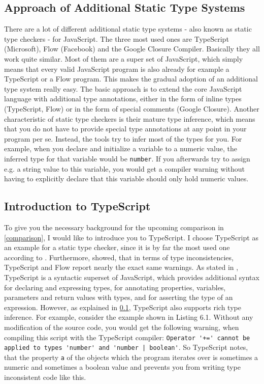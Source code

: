 \documentclass[runningheads,a4paper]{llncs}
\begin{document}
\subsection{Approach of Additional Static Type Systems} \label{staticTypeSystems}
There are a lot of different additional static type systems - also known as static type checkers - for JavaScript.
The three most used ones are TypeScript (Microsoft), Flow (Facebook) and the Google Closure Compiler.
Basically they all work quite similar.
Most of them are a super set of JavaScript, which simply means that every valid JavaScript program is also already for example a TypeScript or a Flow program.
This makes the gradual adoption of an additional type system really easy.
The basic approach is to extend the core JavaScript language with additional type annotations, either in the form of inline types (TypeScript, Flow) or in the form of special comments (Google Closure).
Another characteristic of static type checkers is their mature type inference, which means that you do not have to provide special type annotations at any point in your program per se.
Instead, the tools try to infer most of the types for you. 
For example, when you declare and initialize a variable to a numeric value, the inferred type for that variable would be \lstinline[columns=fixed]{number}.
If you afterwards try to assign e.g. a string value to this variable, you would get a compiler warning without having to explicitly declare that this variable should only hold numeric values.


\subsection{Introduction to TypeScript}
To give you the necessary background for the upcoming comparison in \ref{comparison}, I would like to introduce you to TypeScript.
I choose TypeScript as an example for a static type checker, since it is by far the most used one according to \cite{StateOfJs}.
Furthermore, \cite{DBLP:conf/icse/GaoBB17} showed, that in terms of type inconsistencies, TypeScript and Flow report nearly the exact same warnings.
As stated in \cite{DBLP:conf/ecoop/BiermanAT14}, TypeScript is a syntactic superset of JavaScript, which provides additional syntax for declaring and expressing types, for annotating properties, variables, parameters and return values with types, and for asserting the type of an expression.
However, as explained in \ref{staticTypeSystems}, TypeScript also supports rich type inference.
For example, consider the example shown in Listing 6.1.
Without any modification of the source code, you would get the following warning, when compiling this script with the TypeScript compiler:
\lstinline[columns=fixed]{Operator '+=' cannot be applied to types 'number' and 'number | boolean'}.
So TypeScript notes, that the property \lstinline[columns=fixed]{a} of the objects which the program iterates over is sometimes a numeric and sometimes a boolean value and prevents you from writing type inconsistent code like this.
\end{document}
